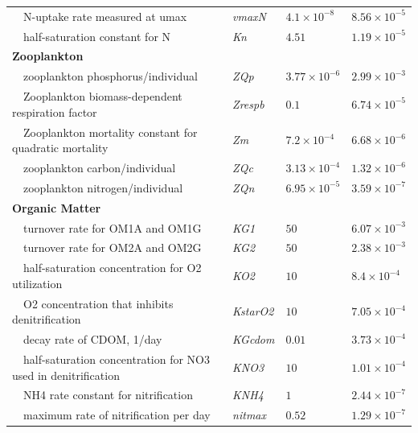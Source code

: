 \documentclass[letterpaper,12pt,oneside]{article}\usepackage[]{graphicx}\usepackage[]{color}
\begin{document}
\begin{table}[!tbp]
{\begin{center}
\begin{tabular}{llll}
~~N-uptake rate measured at umax&\textit{vmaxN}&$4.1\times 10^{-8}$&$8.56\times 10^{-5}$\tabularnewline
~~half-saturation constant for N&\textit{Kn}&$4.51$&$1.19\times 10^{-5}$\tabularnewline
\hline
{\bfseries Zooplankton}&&&\tabularnewline
~~zooplankton phosphorus/individual&\textit{ZQp}&$3.77\times 10^{-6}$&$2.99\times 10^{-3}$\tabularnewline
~~Zooplankton biomass-dependent respiration factor&\textit{Zrespb}&$0.1$&$6.74\times 10^{-5}$\tabularnewline
~~Zooplankton mortality constant for quadratic mortality&\textit{Zm}&$7.2\times 10^{-4}$&$6.68\times 10^{-6}$\tabularnewline
~~zooplankton carbon/individual&\textit{ZQc}&$3.13\times 10^{-4}$&$1.32\times 10^{-6}$\tabularnewline
~~zooplankton nitrogen/individual&\textit{ZQn}&$6.95\times 10^{-5}$&$3.59\times 10^{-7}$\tabularnewline
\hline
{\bfseries Organic Matter}&&&\tabularnewline
~~turnover rate for OM1A and OM1G&\textit{KG1}&$50$&$6.07\times 10^{-3}$\tabularnewline
~~turnover rate for OM2A and OM2G&\textit{KG2}&$50$&$2.38\times 10^{-3}$\tabularnewline
~~half-saturation concentration for O2 utilization&\textit{KO2}&$10$&$8.4\times 10^{-4}$\tabularnewline
~~O2 concentration that inhibits denitrification&\textit{KstarO2}&$10$&$7.05\times 10^{-4}$\tabularnewline
~~decay rate of CDOM, 1/day&\textit{KGcdom}&$0.01$&$3.73\times 10^{-4}$\tabularnewline
~~half-saturation concentration for NO3 used in denitrification&\textit{KNO3}&$10$&$1.01\times 10^{-4}$\tabularnewline
~~NH4 rate constant for nitrification&\textit{KNH4}&$1$&$2.44\times 10^{-7}$\tabularnewline
~~maximum rate of nitrification per day&\textit{nitmax}&$0.52$&$1.29\times 10^{-7}$\tabularnewline
\hline
\end{tabular}\end{center}}

\end{table}
\end{document}

